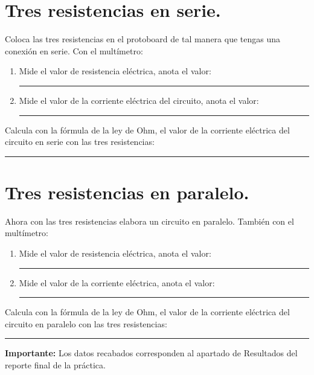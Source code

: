 \documentclass[14pt]{extarticle}
\begin{document}
\section{Tres resistencias en serie.}

Coloca las tres resistencias en el protoboard de tal manera que tengas una conexión en serie. Con el multímetro:
\begin{enumerate}
\item Mide el valor de resistencia eléctrica, anota el valor: \rule{2cm}{0.1mm}
\item Mide el valor de la corriente eléctrica del circuito, anota el valor: \rule{2cm}{0.1mm}
\end{enumerate}
Calcula con la fórmula de la ley de Ohm, el valor de la corriente eléctrica del circuito en serie con las tres resistencias: \rule{2cm}{0.1mm}

\section{Tres resistencias en paralelo.}

Ahora con las tres resistencias elabora un circuito en paralelo. También con el multímetro:
\begin{enumerate}
\item Mide el valor de resistencia eléctrica, anota el valor: \rule{2cm}{0.1mm}
\item Mide el valor de la corriente eléctrica, anota el valor: \rule{2cm}{0.1mm}
\end{enumerate}
Calcula con la fórmula de la ley de Ohm, el valor de la corriente eléctrica del circuito en paralelo con las tres resistencias: \rule{2cm}{0.1mm}

\textbf{Importante:} Los datos recabados corresponden al apartado de Resultados del reporte final de la práctica.
\end{document}
